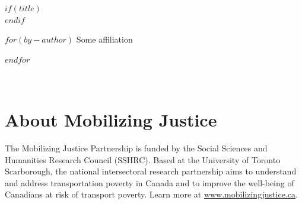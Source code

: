 \begin{flushleft}
    \vspace{-7cm}
      $if(title)$
        {}\\ %
      $endif$
      \vspace{1cm} 
      
      $for(by-author)$
        {}\hskip 10pt {Some affiliation}\par %
      $endfor$
\end{flushleft}

\begin{flushright}
    \vspace{-1cm}
        {}\\ %
        \vspace{1cm}     
        {} %
\end{flushright}




\newpage


\section*{About Mobilizing Justice}

The Mobilizing Justice Partnership is funded by the Social Sciences and Humanities Research Council (SSHRC). Based at the University of Toronto Scarborough, the national intersectoral research partnership aims to understand and address transportation poverty in Canada and to improve the well-being of Canadians at risk of transport poverty. Learn more at \url{www.mobilizingjustice.ca}.

